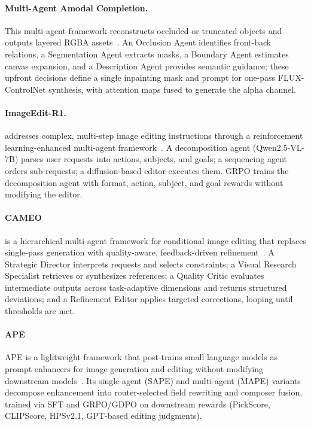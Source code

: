\paragraph{Multi-Agent Amodal Completion.}
This multi-agent framework reconstructs occluded or truncated objects and outputs layered RGBA assets~\cite{avg250917757}. An Occlusion Agent identifies front-back relations, a Segmentation Agent extracts masks, a Boundary Agent estimates canvas expansion, and a Description Agent provides semantic guidance; these upfront decisions define a single inpainting mask and prompt for one-pass FLUX-ControlNet synthesis, with attention maps fused to generate the alpha channel.

\paragraph{ImageEdit-R1.}
 addresses complex, multi-step image editing instructions through a reinforcement learning-enhanced multi-agent framework~\cite{avg260308059}. A decomposition agent (Qwen2.5-VL-7B) parses user requests into actions, subjects, and goals; a sequencing agent orders sub-requests; a diffusion-based editor executes them. GRPO trains the decomposition agent with format, action, subject, and goal rewards without modifying the editor.

\paragraph{CAMEO}
 is a hierarchical multi-agent framework for conditional image editing that replaces single-pass generation with quality-aware, feedback-driven refinement~\cite{pu2026cameo}. A Strategic Director interprets requests and selects constraints; a Visual Research Specialist retrieves or synthesizes references; a Quality Critic evaluates intermediate outputs across task-adaptive dimensions and returns structured deviations; and a Refinement Editor applies targeted corrections, looping until thresholds are met. 

\paragraph{APE}
APE is a lightweight framework that post-trains small language models as prompt enhancers for image generation and editing  without modifying downstream models~\cite{avg260600204}. Its single-agent (SAPE) and multi-agent (MAPE) variants decompose enhancement into router-selected field rewriting and composer fusion, trained via SFT and GRPO/GDPO on downstream rewards (PickScore, CLIPScore, HPSv2.1, GPT-based editing judgments). 


